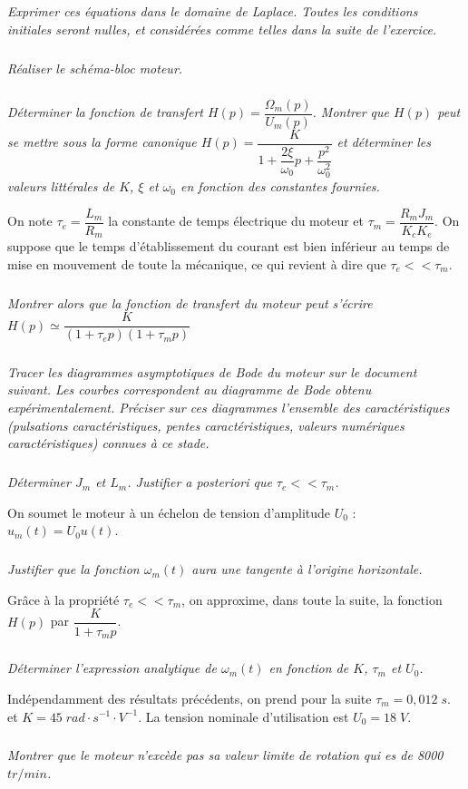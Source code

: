 \documentclass[10pt]{article}
\begin{document}
\subparagraph{}
\textit{Exprimer ces équations dans le domaine de Laplace. Toutes les conditions initiales seront nulles, et considérées comme telles dans la suite de l'exercice.}
  
\subparagraph{}
\textit{Réaliser le schéma-bloc moteur.}
  
\subparagraph{}
\textit{Déterminer la fonction de transfert $H(p)=\dfrac{\Omega_m(p)}{U_m(p)}$. Montrer que $H(p)$ peut se mettre sous la forme canonique $H(p)=\dfrac{K}{1+\dfrac{2\xi}{\omega_0}p+\dfrac{p^2}{\omega_0^2}}$ et déterminer les valeurs littérales de $K$, $\xi$ et $\omega_0$ en fonction des constantes fournies.}
  
On note $\tau_e = \dfrac{L_m}{R_m}$ la constante de temps électrique du moteur et $\tau_m=\dfrac{R_m J_m}{K_cK_e}$. On suppose que le temps d'établissement du courant est bien inférieur au temps de mise en mouvement de toute la mécanique, ce qui revient à dire que $\tau_e << \tau_m$. 
  
  
\subparagraph{}
\textit{Montrer alors que la fonction de transfert du moteur peut s'écrire $H(p)\simeq\dfrac{K}{\left(1+\tau_e p\right)\left(1+\tau_m p\right)}$}
  
  
\subparagraph{}
\textit{Tracer les diagrammes asymptotiques de Bode du moteur sur le document suivant. Les courbes correspondent au diagramme de Bode obtenu expérimentalement. Préciser sur ces diagrammes l'ensemble des caractéristiques (pulsations caractéristiques, pentes caractéristiques, valeurs numériques caractéristiques) connues à ce stade.}
  
\subparagraph{}
\textit{Déterminer $J_m$ et $L_m$. Justifier a posteriori que $\tau_e << \tau_m$.}
  
On soumet le moteur à un échelon de tension d'amplitude $U_0$ : $u_m(t)=U_0 u(t)$. 
  
\subparagraph{}
\textit{Justifier que la fonction $\omega_m(t)$ aura une tangente à l'origine horizontale.}

Grâce à la propriété $\tau_e<<\tau_m$, on approxime, dans toute la suite, la fonction $H(p)$ par $\dfrac{K}{1+\tau_m p}$.

  
\subparagraph{}
\textit{Déterminer l'expression analytique de $\omega_m(t)$ en fonction de $K$, $\tau_m$ et $U_0$. }

Indépendamment des résultats précédents, on prend pour la suite $\tau_m=0,012\; s.$ et $K=45\; rad\cdot s^{-1}\cdot V^{-1}$. La tension nominale d'utilisation est $U_0=18\; V$.


\subparagraph{}
\textit{Montrer que le moteur n'excède pas sa valeur limite de rotation qui es de 8000 $tr/min$.}
\end{document}
